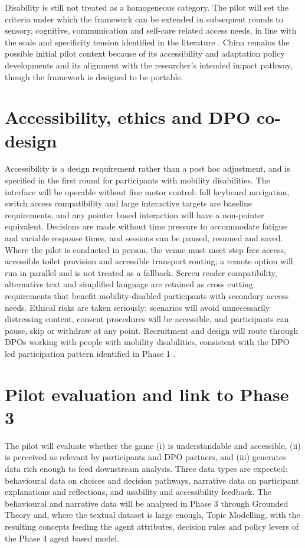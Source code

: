 \documentclass[12pt,a4paper]{report}
\begin{document}
Disability is still not treated as a homogeneous category. The pilot will set the criteria under which the framework can be extended in subsequent rounds to sensory, cognitive, communication and self-care related access needs, in line with the scale and specificity tension identified in the literature \cite{craig2023twintrack,calgaro2021silent}. China remains the possible initial pilot context because of its accessibility and adaptation policy developments and its alignment with the researcher's intended impact pathway, though the framework is designed to be portable.

\section{Accessibility, ethics and DPO co-design}
Accessibility is a design requirement rather than a post hoc adjustment, and is specified in the first round for participants with mobility disabilities. The interface will be operable without fine motor control: full keyboard navigation, switch access compatibility and large interactive targets are baseline requirements, and any pointer based interaction will have a non-pointer equivalent. Decisions are made without time pressure to accommodate fatigue and variable response times, and sessions can be paused, resumed and saved. Where the pilot is conducted in person, the venue must meet step free access, accessible toilet provision and accessible transport routing; a remote option will run in parallel and is not treated as a fallback. Screen reader compatibility, alternative text and simplified language are retained as cross cutting requirements that benefit mobility-disabled participants with secondary access needs. Ethical risks are taken seriously: scenarios will avoid unnecessarily distressing content, consent procedures will be accessible, and participants can pause, skip or withdraw at any point. Recruitment and design will route through DPOs working with people with mobility disabilities, consistent with the DPO led participation pattern identified in Phase 1 \cite{pertiwi2019dpo,villeneuve2017dpo,rahatiningtyas2025yogyakarta}.

\section{Pilot evaluation and link to Phase 3}
The pilot will evaluate whether the game (i) is understandable and accessible, (ii) is perceived as relevant by participants and DPO partners, and (iii) generates data rich enough to feed downstream analysis. Three data types are expected: behavioural data on choices and decision pathways, narrative data on participant explanations and reflections, and usability and accessibility feedback. The behavioural and narrative data will be analysed in Phase 3 through Grounded Theory and, where the textual dataset is large enough, Topic Modelling, with the resulting concepts feeding the agent attributes, decision rules and policy levers of the Phase 4 agent based model.
\end{document}
